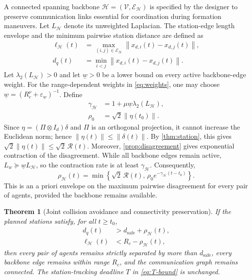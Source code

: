 \documentclass[letterpaper,10pt,conference]{ieeeconf}
\newcommand{\norm}[1]{\left\lVert #1 \right\rVert}
\newcommand{\dsafe}{d_{\mathrm{safe}}}
\newcommand{\Rc}{R_c}
\newcommand{\epsw}{\varepsilon_w}
\newcommand{\rhoH}{\rho_{\mathcal H}}
\newcommand{\ellH}{\ell_{\mathcal H}}
\newcommand{\gamH}{\gamma_{\mathcal H}}
\newtheorem{theorem}{Theorem}
\begin{document}
A connected spanning backbone $\mathcal H=(\mathcal V,\mathcal E_{\mathcal H})$ is specified by the designer to preserve communication links essential for coordination during formation maneuvers. Let $L_{\mathcal H}$ denote its unweighted Laplacian. The station-edge length envelope and the minimum pairwise station distance are defined as
\begin{equation}
\begin{aligned}
  \ellH(t)&=\max_{(i,j)\in\mathcal E_\mathcal H}\norm{x_{d,i}(t)-x_{d,j}(t)},\\
  d_q(t)&=\min_{i<j}\norm{x_{d,i}(t)-x_{d,j}(t)}.
\end{aligned}
\label{eq:station-geometry}
\end{equation}
Let $\lambda_2(L_{\mathcal H})>0$ and let $\underline w>0$ be a lower bound on every active backbone-edge weight. For the range-dependent weights in \eqref{eq:weights}, one may choose $\underline w=(\Rc^\nu+\epsw)^{-1}$. Define
\begin{equation}
\begin{aligned}
  \gamH&=1+\mu\underline w\lambda_2(L_{\mathcal H}),\\
  \rho_0&=\sqrt2\norm{\eta(t_0)}.
\end{aligned}
\label{eq:gain-definitions}
\end{equation}
Since $\eta=(\Pi\otimes I_d)\delta$ and $\Pi$ is an orthogonal projection, it cannot increase the Euclidean norm; hence $\|\eta(t)\|\leq\|\delta(t)\|$. By \cref{thm:station}, this gives $\sqrt2\|\eta(t)\|\leq\sqrt2\,\mathcal R(t)$. Moreover, \cref{prop:disagreement} gives exponential contraction of the disagreement. While all backbone edges remain active, $L_w\succeq\underline w L_{\mathcal H}$, so the contraction rate is at least $\gamH$. Consequently,
\begin{equation}
  \rhoH(t)=\min\left\{\sqrt2\,\mathcal R(t),\,
  \rho_0e^{-\gamH(t-t_0)}\right\}.
  \label{eq:rho-envelope}
\end{equation}
This is an a priori envelope on the maximum pairwise disagreement for every pair of agents, provided the backbone remains available.

\begin{theorem}[Joint collision avoidance and connectivity preservation]
\label{thm:safety-connectivity}
If the planned stations satisfy, for  all $t\geq t_0$,
\begin{align}
  d_q(t)&>\dsafe+\rhoH(t), \label{eq:safe-condition}\\
  \ellH(t)&<\Rc-\rhoH(t), \label{eq:connect-condition}
\end{align}
then every pair of agents remains strictly separated by more than $\dsafe$, every backbone edge remains within range $\Rc$, and the communication graph remains connected. The station-tracking deadline $T$ in \eqref{eq:T-bound} is unchanged.
\end{theorem}
\end{document}
